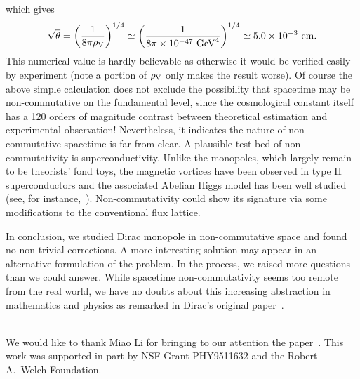 \documentclass[a4paper,12pt]{article}
\begin{document}
\vskip -0.5cm
\noindent which gives
\begin{equation}
\sqrt{\theta}=\left(\frac{1}{8\pi \rho_{\rm V}}\right)^{1/4}\simeq 
          \left(\frac{1}{8\pi \times 10^{-47}\,\,\mathrm{GeV}^4}\right)^{1/4}
          \simeq 5.0\times 10^{-3}\,\,\mathrm{cm}. 
\end{equation}
This numerical value is hardly believable as otherwise it 
would be verif\mbox{}ied
easily by experiment (note a portion of $\rho_{\rm V}$ only makes the
result worse). Of course the above simple calculation does not exclude
the possibility that spacetime may be non-commutative on the fundamental
level, since the cosmological constant itself has a 120 orders of magnitude
contrast between theoretical estimation and experimental observation!
Nevertheless, it indicates the nature of non-commutative spacetime is far
from clear. A plausible test bed of non-commutativity is superconductivity.
Unlike the monopoles, which largely remain to be theorists' fond toys,
the magnetic vortices have been observed in type II superconductors and 
the associated Abelian Higgs model has been well studied (see, 
for instance,~\cite{jt}). Non-commutativity could show its signature via
some modif\mbox{}ications to the conventional f\mbox{}lux lattice.

In conclusion, we studied Dirac monopole in non-commutative space and
found no non-trivial corrections. A more interesting solution may appear
in an alternative formulation of the problem. In the process, we raised
more questions than we could answer. While spacetime non-commutativity 
seems too remote from the real world, we have no doubts about this 
increasing abstraction in mathematics and physics as remarked in Dirac's
original paper~\cite{pd}.    

\vskip 1cm
\\

\noindent We would like to thank Miao Li for bringing to our attention the 
paper~\cite{dl}. This work was supported in part by NSF Grant PHY9511632 
and the Robert A.~Welch Foundation.
\end{document}
